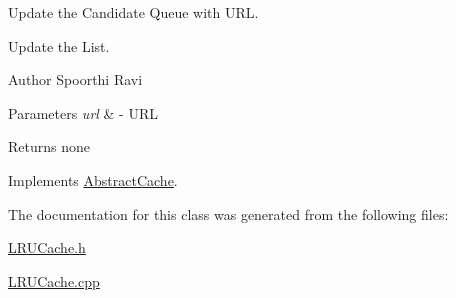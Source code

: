 \-Update the \-Candidate \-Queue with \-U\-R\-L. 

\-Update the \-List.

\begin{DoxyAuthor}{\-Author}
\-Spoorthi \-Ravi 
\end{DoxyAuthor}

\begin{DoxyParams}{\-Parameters}
{\em url} & -\/ \-U\-R\-L \\
\hline
\end{DoxyParams}
\begin{DoxyReturn}{\-Returns}
none 
\end{DoxyReturn}


\-Implements \hyperlink{classAbstractCache_a67552fbca85ce7dbc7e2c553b1036884}{\-Abstract\-Cache}.



\-The documentation for this class was generated from the following files\-:\begin{DoxyCompactItemize}
\item 
\hyperlink{LRUCache_8h}{\-L\-R\-U\-Cache.\-h}\item 
\hyperlink{LRUCache_8cpp}{\-L\-R\-U\-Cache.\-cpp}\end{DoxyCompactItemize}
